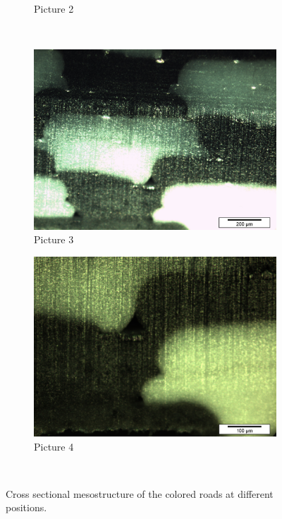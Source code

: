 \begin{figure}
\begin{subfigure}[b]{0.48\textwidth}
    \caption{Picture 2}
    \label{fig:2}
  \end{subfigure}
  \\
    \begin{subfigure}[b]{0.48\textwidth}
    \includegraphics[width=\textwidth]{chapter_4_RVE_Definition/figures/colored/Tv42_LI.jpg}
    \caption{Picture 3}
    \label{fig:3}
  \end{subfigure}
  \begin{subfigure}[b]{0.48\textwidth}
    \includegraphics[width=\textwidth]{chapter_4_RVE_Definition/figures/colored/Tv86a_LI.jpg}
    \caption{Picture 4}
    \label{fig:4}
  \end{subfigure}
  \\
  
  \caption{Cross sectional mesostructure of the colored roads at different positions. }
    \label{fig:coloredroads}
\end{figure}

